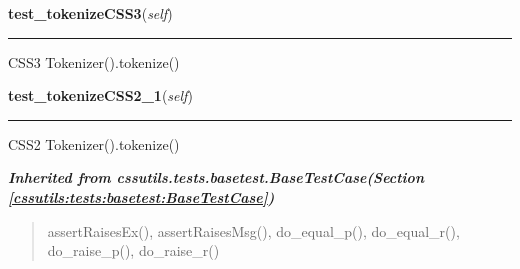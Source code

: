     \label{cssutils:tests:test_tokenize2:TokenizerTestCase:test_tokenizeCSS3}

    \vspace{0.5ex}

\hspace{.8\funcindent}\begin{boxedminipage}{\funcwidth}

    \raggedright \textbf{test\_tokenizeCSS3}(\textit{self})

    \vspace{-1.5ex}

    \rule{\textwidth}{0.5\fboxrule}
\setlength{\parskip}{2ex}
    CSS3 Tokenizer().tokenize()

\setlength{\parskip}{1ex}
    \end{boxedminipage}

    \label{cssutils:tests:test_tokenize2:TokenizerTestCase:test_tokenizeCSS2_1}

    \vspace{0.5ex}

\hspace{.8\funcindent}\begin{boxedminipage}{\funcwidth}

    \raggedright \textbf{test\_tokenizeCSS2\_1}(\textit{self})

    \vspace{-1.5ex}

    \rule{\textwidth}{0.5\fboxrule}
\setlength{\parskip}{2ex}
    CSS2 Tokenizer().tokenize()

\setlength{\parskip}{1ex}
    \end{boxedminipage}


\large{\textbf{\textit{Inherited from cssutils.tests.basetest.BaseTestCase\textit{(Section \ref{cssutils:tests:basetest:BaseTestCase})}}}}

\begin{quote}
assertRaisesEx(), assertRaisesMsg(), do\_equal\_p(), do\_equal\_r(), do\_raise\_p(), do\_raise\_r()
\end{quote}

